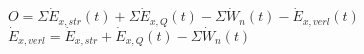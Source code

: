 \( O = \Sigma \dot{E}_{x,str}(t) + \Sigma \dot{E}_{x,Q}(t) - \Sigma \dot{W}_n(t) - \dot{E}_{x,verl}(t) \)  
\( \dot{E}_{x,verl} = \dot{E}_{x,str} + \dot{E}_{x,Q}(t) - \Sigma \dot{W}_n(t) \)